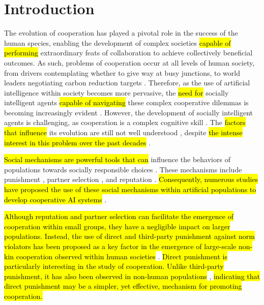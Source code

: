\documentclass[sn-aps,numbered]{sn-jnl}%
\theoremstyle{thmstyleone}%
\theoremstyle{thmstyletwo}%
\theoremstyle{thmstylethree}%
\begin{document}
\maketitle

\section{Introduction}

The evolution of cooperation has played a pivotal role in the success of the human species, enabling the development of complex societies \hl{capable of performing} extraordinary feats of collaboration to achieve collectively beneficial outcomes. As such, problems of cooperation occur at all levels of human society, from drivers contemplating whether to give way at busy junctions, to world leaders negotiating carbon reduction targets \citep{open_problems_coop_ai}. Therefore, as the use of artificial intelligence within society becomes more pervasive, the \hl{need for} socially intelligent agents \hl{capable of navigating} these complex cooperative dilemmas is becoming increasingly evident \citep{open_problems_coop_ai, coop_ai_nature_comment}. However, the development of socially intelligent agents is challenging, as cooperation is a complex cognitive skill \citep{manifesto_multi_agent}. The \hl{factors that influence} its evolution are still not well understood \citep{evolution_of_cooperation, mirco_partner_selection}, despite \hl{the intense interest in this problem over the past decades} \citep{nowak2006evolutionary,nowak2006five,sigmund2010calculus,bowles2011cooperative}.

\hl{Social mechanisms are powerful tools that can} influence the behaviors of populations towards socially responsible choices \citep{santos2021complexity,santos2018social,raihani2021social,open_problems_coop_ai}. These mechanisms include punishment \citep{Redhead2021, Barclay2016, boyd1992punishment}, partner selection \citep{Milinski2002, Albert2007_nicer, Barclay2007, Sylwester2010, Feng_partnerchoice, Rand2011}, and reputation \citep{Roberts2021, networks_reliable_rep_coop_review, Gross2019, language_of_coop}. \hl{Consequently, numerous studies have proposed the use of these social mechanisms within artificial populations to develop cooperative AI systems} \citep{open_problems_coop_ai, mirco_partner_selection, coop_reputation_mirco, silly_rules_ssd, division_of_labour, parity_sympathy_reciprocity, metapunishing}.

\hl{Although reputation and partner selection can facilitate the emergence of cooperation within small groups, they have a negligible impact on larger populations. Instead, the use of direct and third-party punishment against norm violators has been proposed as a key factor in the emergence of large-scale non-kin cooperation observed within human societies} \citep{Redhead2021, silly_rules_ssd, coop_sizes_punish_partner_choice_rep, boyd1992punishment, tpp_4_year_olds}. \hl{Direct punishment is particularly interesting in the study of cooperation. Unlike third-party punishment, it has also been observed in non-human populations} \citep{Redhead2021, tpp_4_year_olds}, \hl{indicating that direct punishment may be a simpler, yet effective, mechanism for promoting cooperation.}
\end{document}
